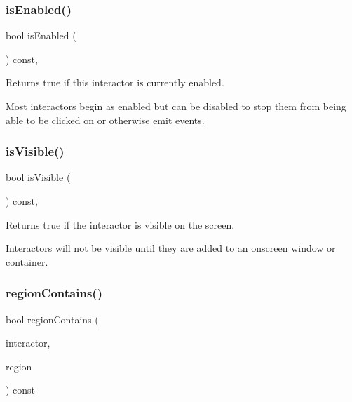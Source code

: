 \subsubsection{\texorpdfstring{is\+Enabled()}{isEnabled()}}
{\footnotesize\ttfamily bool is\+Enabled (\begin{DoxyParamCaption}{ }\end{DoxyParamCaption}) const\hspace{0.3cm}{\ttfamily [virtual]}, {\ttfamily [inherited]}}



Returns true if this interactor is currently enabled. 

Most interactors begin as enabled but can be disabled to stop them from being able to be clicked on or otherwise emit events. \mbox{\label{classsgl_1_1GInteractor_a9d8a6cfb13917785c143e74d40e4e2be}} 
\subsubsection{\texorpdfstring{is\+Visible()}{isVisible()}}
{\footnotesize\ttfamily bool is\+Visible (\begin{DoxyParamCaption}{ }\end{DoxyParamCaption}) const\hspace{0.3cm}{\ttfamily [virtual]}, {\ttfamily [inherited]}}



Returns true if the interactor is visible on the screen. 

Interactors will not be visible until they are added to an onscreen window or container. \mbox{\label{classsgl_1_1GContainer_a8909db9abf4dc80058f9e4a7b90ea2d0}} 
\subsubsection{\texorpdfstring{region\+Contains()}{regionContains()}\hspace{0.1cm}{\footnotesize\ttfamily [1/4]}}
{\footnotesize\ttfamily bool region\+Contains (\begin{DoxyParamCaption}\item[{\mbox{\hyperlink{classsgl_1_1GInteractor}{G\+Interactor}} $\ast$}]{interactor,  }\item[{\mbox{\hyperlink{classsgl_1_1GContainer_a81a01a86de31071a92e6cce0bab9bc4b}{G\+Container\+::\+Region}}}]{region }\end{DoxyParamCaption}) const\hspace{0.3cm}{\ttfamily [virtual]}}



